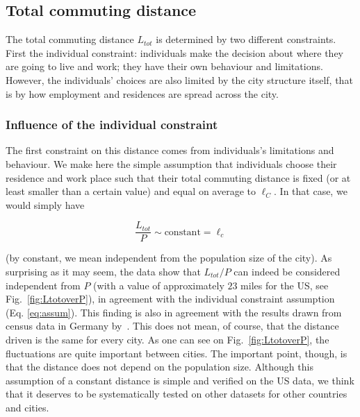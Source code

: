 \subsection{Total commuting distance}
\label{sec:total_length_driven}

The total commuting distance $L_{tot}$ is determined by two different
constraints. First the individual constraint: individuals make the decision
about where they are going to live and work; they have their own behaviour and
limitations. However, the individuals' choices are also limited by the city
structure itself, that is by how employment and residences are spread across the
city.



\subsubsection{Influence of the individual constraint} 

The first constraint on this distance comes from individuals's limitations and
behaviour. We make here the simple assumption that individuals choose their
residence and work place such that their total commuting distance is fixed (or
at least smaller than a certain value) and equal on average to $\ell_C$. In that
case, we would simply have

\begin{equation} 
    \frac{L_{tot}}{P} \sim \text{constant} = \ell_c 
    \label{eq:assum}
\end{equation}

(by constant, we mean independent from the population size of the city). As
surprising as it may seem, the data show that $L_{tot}/P$ can indeed be considered
 independent from $P$ (with a value of approximately $23$ miles for
the US, see Fig.~\ref{fig:LtotoverP}), in agreement with the individual
constraint assumption (Eq. \ref{eq:assum}). This finding is also in agreement
with the results drawn from census data in Germany by~\cite{Wilkerson:2014}.
This does not mean, of course, that the distance driven is the same for every
city. As one can see on Fig.~\ref{fig:LtotoverP}, the fluctuations are quite
important between cities. The important point, though, is that the distance does not depend on the population size.
Although this assumption of a constant distance is simple and verified on the US
data, we think that it deserves to be systematically tested on other datasets
for other countries and cities. 

